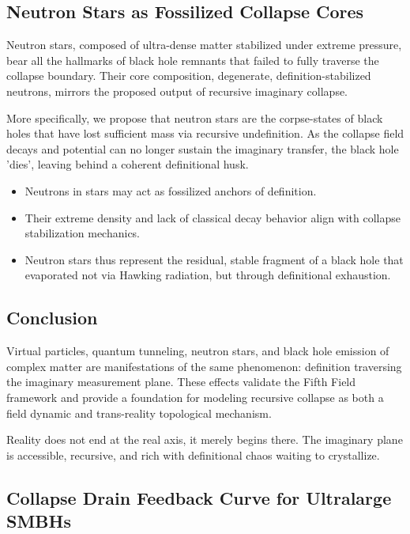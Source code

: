 \subsection{Neutron Stars as Fossilized Collapse Cores}
Neutron stars, composed of ultra-dense matter stabilized under extreme pressure, bear all the hallmarks of black hole remnants that failed to fully traverse the collapse boundary. Their core composition, degenerate, definition-stabilized neutrons, mirrors the proposed output of recursive imaginary collapse.

More specifically, we propose that neutron stars are the corpse-states of black holes that have lost sufficient mass via recursive undefinition. As the collapse field decays and potential can no longer sustain the imaginary transfer, the black hole 'dies', leaving behind a coherent definitional husk.

\begin{itemize}
  \item Neutrons in stars may act as fossilized anchors of definition.
  \item Their extreme density and lack of classical decay behavior align with collapse stabilization mechanics.
  \item Neutron stars thus represent the residual, stable fragment of a black hole that evaporated not via Hawking radiation, but through definitional exhaustion.
\end{itemize}

\subsection{Conclusion}\cite{observer_geometry_framework, blackhole_information_coherence}
Virtual particles, quantum tunneling, neutron stars, and black hole emission of complex matter are manifestations of the same phenomenon: definition traversing the imaginary measurement plane. These effects validate the Fifth Field framework and provide a foundation for modeling recursive collapse as both a field dynamic and trans-reality topological mechanism.

Reality does not end at the real axis, it merely begins there. The imaginary plane is accessible, recursive, and rich with definitional chaos waiting to crystallize.

\subsection{Collapse Drain Feedback Curve for Ultralarge SMBHs}

